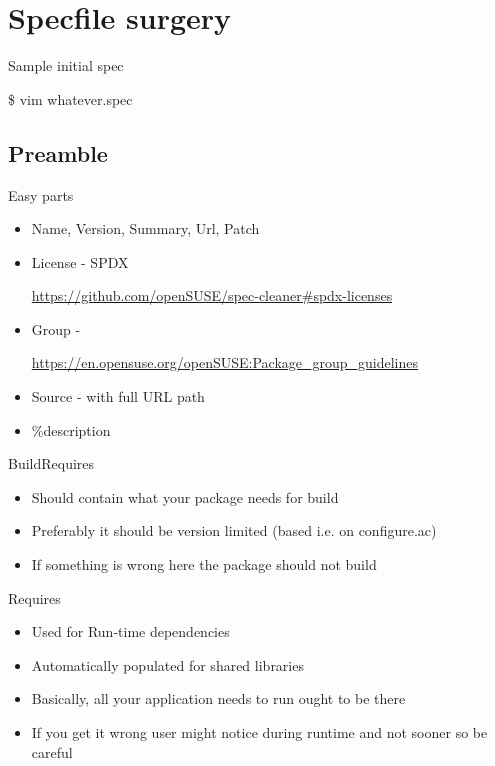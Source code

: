 \documentclass{beamer}
\begin{document}
\section{Specfile surgery}

\begin{frame}[t]{Sample initial spec}
	\begin{center}\$ vim whatever.spec\end{center}
\end{frame}

\subsection{Preamble}

\begin{frame}[t]{Easy parts}
	\begin{itemize}
	\item Name, Version, Summary, Url, Patch
	\item License - SPDX \begin{small}\url{https://github.com/openSUSE/spec-cleaner\#spdx-licenses}\end{small}
    \item Group - \begin{small}\url{https://en.opensuse.org/openSUSE:Package\_group\_guidelines}\end{small}
    \item Source - with full URL path
    \item \%description
	\end{itemize}
\end{frame}

\begin{frame}[t]{BuildRequires}
	\begin{itemize}
	\item Should contain what your package needs for build
    \item Preferably it should be version limited (based i.e. on configure.ac)
    \item If something is wrong here the package should not build
	\end{itemize}
\end{frame}

\begin{frame}[t]{Requires}
	\begin{itemize}
    \item Used for Run-time dependencies
    \item Automatically populated for shared libraries
    \item Basically, all your application needs to run ought to be there
    \item If you get it wrong user might notice during runtime and not sooner so be careful
	\end{itemize}
\end{frame}
\end{document}
